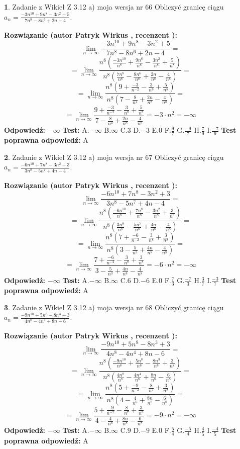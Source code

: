 \documentclass[12pt, a4paper]{article}
\theoremstyle{definition} %
\newtheorem{zad}{}
\newcommand{\zadStart}[1]{\begin{zad}#1\newline}
\newcommand{\zadStop}{\end{zad}}
\newcommand{\rozwStart}[2]{\noindent \textbf{Rozwiązanie (autor #1 , recenzent #2): }\newline}
\newcommand{\rozwStop}{\newline}
\newcommand{\odpStart}{\noindent \textbf{Odpowiedź:}\newline}
\newcommand{\odpStop}{\newline}
\newcommand{\testStart}{\noindent \textbf{Test:}\newline}
\newcommand{\testStop}{\newline}
\newcommand{\kluczStart}{\noindent \textbf{Test poprawna odpowiedź:}\newline}
\newcommand{\kluczStop}{\newline}
\begin{document}
\zadStart{Zadanie z Wikieł Z 3.12 a) moja wersja nr 66}
Obliczyć granicę ciągu $a_{n}=\frac{-3n^{10}+9n^{8}-3n^{2}+5}{7n^{8}-8n^{6}+2n-4}$.
\zadStop
\rozwStart{Patryk Wirkus}{}
$$\lim\limits_{n\to\infty}\frac{-3n^{10}+9n^{8}-3n^{2}+5}{7n^{8}-8n^{6}+2n-4}=$$
$$=\lim\limits_{n\to\infty}\frac{n^{8}\left(\frac{-3n^{10}}{n^{8}}+\frac{9n^{8}}{n^{8}}-\frac{3n^{2}}{n^{8}}+\frac{5}{n^{8}}\right)}{n^{8}\left(\frac{7n^{8}}{n^{8}}-\frac{8n^{6}}{n^{8}}+\frac{2n}{n^{8}}-\frac{4}{n^{8}}\right)}=$$
$$=\lim\limits_{n\to\infty}\frac{n^{8}\left(9+\frac{-3}{n^{-2}}-\frac{3}{n^{8}}+\frac{5}{n^{8}}\right)}
{n^{8}\left(7-\frac{8}{n^{4}}+\frac{2n}{n^{8}}-\frac{4}{n^{8}}\right)}=$$
$$=\lim\limits_{n\to\infty}\frac{9+\frac{-3}{n^{-2}}-\frac{3}{n^{8}}+\frac{5}{n^{8}}}{7-\frac{8}{n^{4}}+\frac{2n}{n^{8}}-\frac{4}{n^{8}}}=-3\cdot n^{2} = -\infty$$
\rozwStop
\odpStart
$-\infty$
\odpStop
\testStart
A.$-\infty$
B.$\infty$
C.$3$
D.$-3$
E.$0$
F.$\frac{9}{7}$
G.$\frac{-9}{7}$
H.$\frac{7}{9}$
I.$\frac{-7}{9}$
\testStop
\kluczStart
A
\kluczStop



\zadStart{Zadanie z Wikieł Z 3.12 a) moja wersja nr 67}
Obliczyć granicę ciągu $a_{n}=\frac{-6n^{10}+7n^{8}-3n^{2}+3}{3n^{8}-5n^{7}+4n-4}$.
\zadStop
\rozwStart{Patryk Wirkus}{}
$$\lim\limits_{n\to\infty}\frac{-6n^{10}+7n^{8}-3n^{2}+3}{3n^{8}-5n^{7}+4n-4}=$$
$$=\lim\limits_{n\to\infty}\frac{n^{8}\left(\frac{-6n^{10}}{n^{8}}+\frac{7n^{8}}{n^{8}}-\frac{3n^{2}}{n^{8}}+\frac{3}{n^{8}}\right)}{n^{8}\left(\frac{3n^{8}}{n^{8}}-\frac{5n^{7}}{n^{8}}+\frac{4n}{n^{8}}-\frac{4}{n^{8}}\right)}=$$
$$=\lim\limits_{n\to\infty}\frac{n^{8}\left(7+\frac{-6}{n^{-2}}-\frac{3}{n^{8}}+\frac{3}{n^{8}}\right)}
{n^{8}\left(3-\frac{5}{n^{3}}+\frac{4n}{n^{8}}-\frac{4}{n^{8}}\right)}=$$
$$=\lim\limits_{n\to\infty}\frac{7+\frac{-6}{n^{-2}}-\frac{3}{n^{8}}+\frac{3}{n^{8}}}{3-\frac{5}{n^{3}}+\frac{4n}{n^{8}}-\frac{4}{n^{8}}}=-6\cdot n^{2} = -\infty$$
\rozwStop
\odpStart
$-\infty$
\odpStop
\testStart
A.$-\infty$
B.$\infty$
C.$6$
D.$-6$
E.$0$
F.$\frac{7}{3}$
G.$\frac{-7}{3}$
H.$\frac{3}{7}$
I.$\frac{-3}{7}$
\testStop
\kluczStart
A
\kluczStop



\zadStart{Zadanie z Wikieł Z 3.12 a) moja wersja nr 68}
Obliczyć granicę ciągu $a_{n}=\frac{-9n^{10}+5n^{8}-8n^{3}+3}{4n^{8}-4n^{4}+8n-6}$.
\zadStop
\rozwStart{Patryk Wirkus}{}
$$\lim\limits_{n\to\infty}\frac{-9n^{10}+5n^{8}-8n^{3}+3}{4n^{8}-4n^{4}+8n-6}=$$
$$=\lim\limits_{n\to\infty}\frac{n^{8}\left(\frac{-9n^{10}}{n^{8}}+\frac{5n^{8}}{n^{8}}-\frac{8n^{3}}{n^{8}}+\frac{3}{n^{8}}\right)}{n^{8}\left(\frac{4n^{8}}{n^{8}}-\frac{4n^{4}}{n^{8}}+\frac{8n}{n^{8}}-\frac{6}{n^{8}}\right)}=$$
$$=\lim\limits_{n\to\infty}\frac{n^{8}\left(5+\frac{-9}{n^{-2}}-\frac{8}{n^{7}}+\frac{3}{n^{8}}\right)}
{n^{8}\left(4-\frac{4}{n^{6}}+\frac{8n}{n^{8}}-\frac{6}{n^{8}}\right)}=$$
$$=\lim\limits_{n\to\infty}\frac{5+\frac{-9}{n^{-2}}-\frac{8}{n^{7}}+\frac{3}{n^{8}}}{4-\frac{4}{n^{6}}+\frac{8n}{n^{8}}-\frac{6}{n^{8}}}=-9\cdot n^{2} = -\infty$$
\rozwStop
\odpStart
$-\infty$
\odpStop
\testStart
A.$-\infty$
B.$\infty$
C.$9$
D.$-9$
E.$0$
F.$\frac{5}{4}$
G.$\frac{-5}{4}$
H.$\frac{4}{5}$
I.$\frac{-4}{5}$
\testStop
\kluczStart
A
\kluczStop
\end{document}
